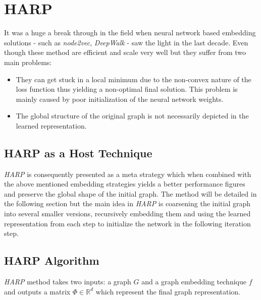 \documentclass[a4paper,13pt]{article}
\begin{document}
\section{HARP~\cite{harp}}
It was a huge a break through in the field when neural network based embedding solutions - such as \textit{node2vec}, \textit{DeepWalk} - saw the light in the last decade. Even though these method are efficient and scale very well but they suffer from two main problems:
\begin{itemize}
    \item They can get stuck in a local minimum due to the non-convex nature of the loss function thus yielding a non-optimal final solution. This problem is mainly caused by poor initialization of the neural network weights.
    \item The global structure of the original graph is not necessarily depicted in the learned representation.
\end{itemize}

\subsection{HARP as a Host Technique}
\textit{HARP} is consequently presented as a meta strategy which when combined with the above mentioned embedding strategies yields a better performance figures and preserve the global shape of the initial graph. The method will be detailed in the following section but the main idea in \textit{HARP} is coarsening the initial graph into several smaller versions, recursively embedding them and using the learned representation from each step to initialize the network in the following iteration step.

\subsection{HARP Algorithm}
\textit{HARP} method takes two inputs: a graph $G$ and a graph embedding technique $f$ and outputs a matrix $\Phi \in \mathbb{R}^d$ which represent the final graph representation.
\end{document}
